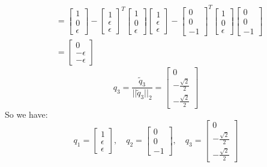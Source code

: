 \documentclass[english,onecolumn]{IEEEtran}
\begin{document}
\begin{enumerate}
\begin{itemize}
\begin{align*}
   		&= \begin{bmatrix}  1 \\ 0 \\ \epsilon \end{bmatrix} -\begin{bmatrix}  1 \\ \epsilon \\ \epsilon \end{bmatrix}^T\begin{bmatrix}  1 \\ 0 \\ \epsilon \end{bmatrix} \begin{bmatrix}  1 \\ \epsilon \\ \epsilon \end{bmatrix}-\begin{bmatrix}  0 \\ 0 \\ -1 \end{bmatrix}^T\begin{bmatrix}  1 \\ 0 \\ \epsilon \end{bmatrix} \begin{bmatrix}  0 \\ 0 \\ -1 \end{bmatrix}\\
   		&= \begin{bmatrix}  0 \\ -\epsilon \\ -\epsilon \end{bmatrix}
   	\end{align*}
   		$$q_3 = \frac{\tilde{q}_3}{||\tilde{q}_3||_2} = \begin{bmatrix}  0 \\ -\frac{\sqrt{2}}{2} \\ -\frac{\sqrt{2}}{2} \end{bmatrix}$$
   	So we have:
   	$$q_1=\begin{bmatrix}  1 \\ \epsilon \\ \epsilon \end{bmatrix},\quad q_2 = \begin{bmatrix}  0 \\ 0 \\ -1\end{bmatrix},\quad q_3=\begin{bmatrix}  0 \\ -\frac{\sqrt{2}}{2} \\ -\frac{\sqrt{2}}{2} \end{bmatrix}$$

\end{itemize}
\end{enumerate}
\end{document}
